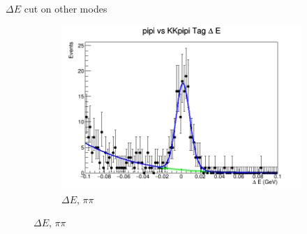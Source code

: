 \documentclass{beamer}
\begin{document}
\begin{frame}{$\Delta E$ cut on other modes}
\begin{figure}
\begin{subfigure}{0.4\textwidth}
      \includegraphics[width=\textwidth]{pipiTagDeltaE.png}
      \caption{$\Delta E$, $\pi\pi$}
    \end{subfigure}
  \end{figure}
\end{frame}
\end{document}
